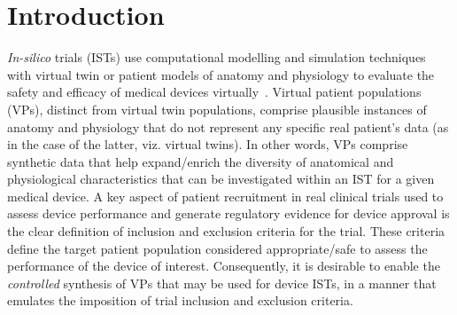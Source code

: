 \documentclass[runningheads]{llncs}
\begin{document}
\section{Introduction}
\textit{In-silico} trials (ISTs) use computational modelling and simulation techniques with virtual twin or patient models of anatomy and physiology to evaluate the safety and efficacy of medical devices virtually~\cite{viceconti2021silico}. Virtual patient populations (VPs), distinct from virtual twin populations, comprise plausible instances of anatomy and physiology that do not represent any specific real patient's data (as in the case of the latter, viz. virtual twins). In other words, VPs comprise synthetic data that help expand/enrich the diversity of anatomical and physiological characteristics that can be investigated within an IST for a given medical device. 
A key aspect of patient recruitment in real clinical trials used to assess device performance and generate regulatory evidence for device approval is the clear definition of inclusion and exclusion criteria for the trial. These criteria define the target patient population considered appropriate/safe to assess the performance of the device of interest. Consequently, it is desirable to enable the \textit{ controlled} synthesis of VPs that may be used for device ISTs, in a manner that emulates the imposition of trial inclusion and exclusion criteria. 
\end{document}
